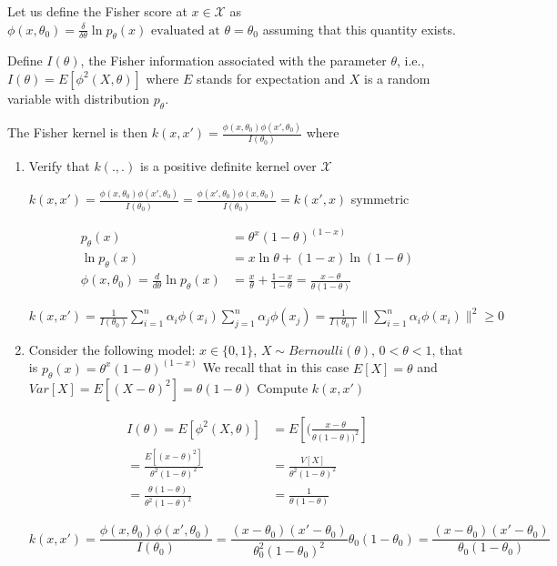 \documentclass[11pt]{article}
\begin{document}
Let us define the Fisher score at $x \in \mathcal{X}$ as
$\phi(x,\theta_0) = \frac{\delta}{\delta \theta} \ln p_\theta(x) \mbox{ evaluated at } \theta=\theta_0$
assuming that this quantity exists. 

Define $I(\theta)$, the Fisher information associated with the parameter $\theta$, i.e., 
$I(\theta)=E[\phi^2(X,\theta)]$
where $E$ stands for expectation and $X$ is a random variable with distribution $p_\theta$. 

The Fisher kernel is then 
$k(x,x')=\frac{\phi(x,\theta_0)\phi(x',\theta_0)}{I(\theta_0)}$
where 
\begin{enumerate}
\item Verify that $k(.,.)$ is a positive definite kernel over $\mathcal{X}$

$k(x,x')=\frac{\phi(x,\theta_0)\phi(x',\theta_0)}{I(\theta_0)}=\frac{\phi(x',\theta_0)\phi(x,\theta_0)}{I(\theta_0)}=k(x',x)$ symmetric

\begin{align*}
  p_\theta(x)&=\theta^x(1-\theta)^{(1-x)} \\
  \ln p_\theta(x)&=x\ln\theta+(1-x)\ln(1-\theta)\\
  \phi(x,\theta_0)= \frac{d}{d \theta} \ln p_\theta(x)&=\frac{x}{\theta}+\frac{1-x}{1-\theta}=\frac{x-\theta}{\theta(1-\theta)}
\end{align*}

$k(x,x')=\frac{1}{I(\theta_0)}\sum_{i=1}^n\alpha_i\phi(x_i)\sum_{j=1}^n\alpha_j\phi(x_j)=\frac{1}{I(\theta_0)}\|\sum_{i=1}^n\alpha_i\phi(x_i)\|^2\ge0$



\item Consider the following model: $x \in \{0,1\}$, $X \sim Bernoulli(\theta)$, $0 < \theta < 1$, that is
$p_\theta(x)=\theta^x(1-\theta)^{(1-x)}$
We recall that in this case $E[X]=\theta$ and $Var[X]=E[(X-\theta)^2]=\theta(1-\theta)$
Compute $k(x,x')$

\begin{align*}
I(\theta)=E[\phi^2(X,\theta)]&=E[(\frac{x-\theta}{\theta(1-\theta))^2}]\\
=\frac{E[(x-\theta)^2]}{\theta^2(1-\theta)^2}&=\frac{V[X]}{\theta^2(1-\theta)^2}\\
=\frac{\theta(1-\theta)}{\theta^2(1-\theta)^2}&=\frac{1}{\theta(1-\theta)}
\end{align*}

$$k(x,x')=\frac{\phi(x,\theta_0)\phi(x',\theta_0)}{I(\theta_0)}=\frac{(x-\theta_0)(x'-\theta_0)}{\theta_0^2(1-\theta_0)^2}\theta_0(1-\theta_0)=\frac{(x-\theta_0)(x'-\theta_0)}{\theta_0(1-\theta_0)}$$


\end{enumerate}
\end{document}
